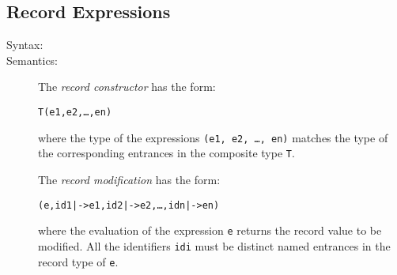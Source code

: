 \documentclass[\pformat,12pt]{article}
\begin{document}
\subsection{Record Expressions} \label{recexpr}

\begin{description}
\item[Syntax:]




\item[Semantics:] The {\it record constructor} has the form:
  \begin{alltt}
    T(e1, e2, \ldots, en)
  \end{alltt}
  where the type of the expressions {\tt (e1, e2, \ldots, en)} matches the
  type of the corresponding entrances in the composite type {\tt T}.

  The {\it record modification} has the form:
  \begin{alltt}
     (e, id1 |-> e1, id2 |-> e2, \ldots, idn |-> en)
  \end{alltt}
  where the evaluation of the expression {\tt e} returns the record value
  to be modified. All the identifiers {\tt idi} must be distinct named
  entrances in the record type of {\tt e}.
     

\end{description}
\end{document}
